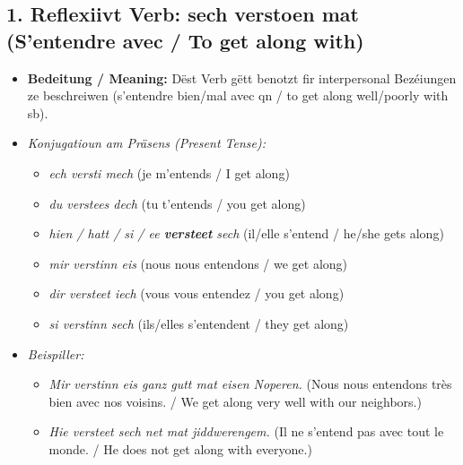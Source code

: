 \subsection*{1. Reflexiivt Verb: \textbf{sech verstoen mat} (S'entendre avec / To get along with)}
\begin{itemize}
    \item \textbf{Bedeitung / Meaning:} Dëst Verb gëtt benotzt fir interpersonal Bezéiungen ze beschreiwen (s'entendre bien/mal avec qn / to get along well/poorly with sb).
    \item \textit{Konjugatioun am Präsens (Present Tense):}
    \begin{itemize}
        \item \textit{ech versti mech} (je m'entends / I get along)
        \item \textit{du verstees dech} (tu t'entends / you get along)
        \item \textit{hien / hatt / si / ee \textbf{versteet} sech} (il/elle s'entend / he/she gets along)
        \item \textit{mir verstinn eis} (nous nous entendons / we get along)
        \item \textit{dir versteet iech} (vous vous entendez / you get along)
        \item \textit{si verstinn sech} (ils/elles s'entendent / they get along)
    \end{itemize}
    \item \textit{Beispiller:}
    \begin{itemize}
        \item \textit{Mir verstinn eis ganz gutt mat eisen Noperen.} (Nous nous entendons très bien avec nos voisins. / We get along very well with our neighbors.)
        \item \textit{Hie versteet sech net mat jiddwerengem.} (Il ne s'entend pas avec tout le monde. / He does not get along with everyone.)
    \end{itemize}
\end{itemize}

\vspace{0.8em}

